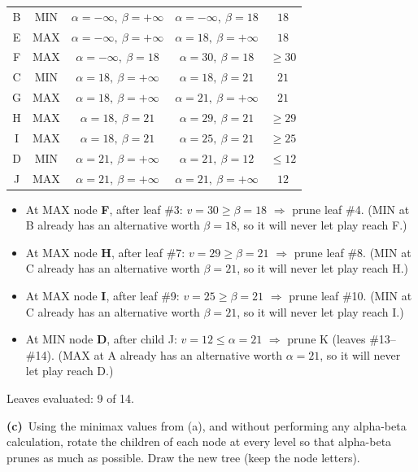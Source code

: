 \documentclass[11pt,a4paper]{article}
\newcommand{\subq}[1]{\par\smallskip\noindent\textbf{#1}\ }
\begin{document}
\begin{solbox}
\begin{center}
\begin{tabular}{c c c c c}
B & MIN & $\alpha=-\infty,\ \beta=+\infty$ & $\alpha=-\infty,\ \beta=18$ & $18$ \\
E & MAX & $\alpha=-\infty,\ \beta=+\infty$ & $\alpha=18,\ \beta=+\infty$ & $18$ \\
F & MAX & $\alpha=-\infty,\ \beta=18$ & $\alpha=30,\ \beta=18$ & $\ge 30$ \\
C & MIN & $\alpha=18,\ \beta=+\infty$ & $\alpha=18,\ \beta=21$ & $21$ \\
G & MAX & $\alpha=18,\ \beta=+\infty$ & $\alpha=21,\ \beta=+\infty$ & $21$ \\
H & MAX & $\alpha=18,\ \beta=21$ & $\alpha=29,\ \beta=21$ & $\ge 29$ \\
I & MAX & $\alpha=18,\ \beta=21$ & $\alpha=25,\ \beta=21$ & $\ge 25$ \\
D & MIN & $\alpha=21,\ \beta=+\infty$ & $\alpha=21,\ \beta=12$ & $\le 12$ \\
J & MAX & $\alpha=21,\ \beta=+\infty$ & $\alpha=21,\ \beta=+\infty$ & $12$ \\\bottomrule\end{tabular}\end{center}\begin{itemize}[leftmargin=1.5em,itemsep=1pt]
\item At MAX node \textbf{F}, after leaf \#3: $v=30 \ge \beta=18$ $\Rightarrow$ prune leaf \#4. (MIN at B already has an alternative worth $\beta=18$, so it will never let play reach F.)
\item At MAX node \textbf{H}, after leaf \#7: $v=29 \ge \beta=21$ $\Rightarrow$ prune leaf \#8. (MIN at C already has an alternative worth $\beta=21$, so it will never let play reach H.)
\item At MAX node \textbf{I}, after leaf \#9: $v=25 \ge \beta=21$ $\Rightarrow$ prune leaf \#10. (MIN at C already has an alternative worth $\beta=21$, so it will never let play reach I.)
\item At MIN node \textbf{D}, after child J: $v=12 \le \alpha=21$ $\Rightarrow$ prune K (leaves \#13--\#14). (MAX at A already has an alternative worth $\alpha=21$, so it will never let play reach D.)
\end{itemize}Leaves evaluated: 9 of 14.
\end{solbox}
\subq{(c)}Using the minimax values from (a), and without performing any alpha-beta calculation, rotate the children of each node at every level so that alpha-beta prunes as much as possible. Draw the new tree (keep the node letters).
\end{document}
